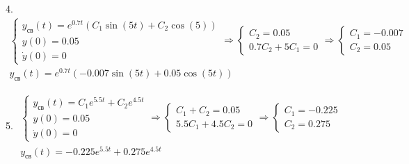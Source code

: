 \vspace{1em}
\begin{par}
\begin{flushleft}
4. $\begin{array}{l}
\left\lbrace \begin{array}{c}
y_{св} (t)=e^{0.7t} (C_1 \sin (5t)+C_2 \cos (5))\\
y(0)=0.05\\
\dot{y} (0)=0
\end{array}\right.\Rightarrow \left\lbrace \begin{array}{c}
C_2 =0.05\\
0.7C_2 +5C_1 =0
\end{array}\right.\Rightarrow \left\lbrace \begin{array}{c}
C_1 =-0.007\\
C_2 =0.05
\end{array}\right.\\
y_{\textrm{св}} (t)=e^{0.7t} (-0.007\sin (5t)+0.05\cos (5t))
\end{array}$
\end{flushleft}
\end{par}


\vspace{1em}
\begin{par}
\begin{flushleft}
5. $\begin{array}{l}
\left\lbrace \begin{array}{c}
y_{св} (t)=C_1 e^{5.5t} +C_2 e^{4.5t} \\
y(0)=0.05\\
\dot{y} (0)=0
\end{array}\right.\Rightarrow \left\lbrace \begin{array}{c}
C_1 +C_2 =0.05\\
5.5C_1 +4.5C_2 =0
\end{array}\right.\Rightarrow \left\lbrace \begin{array}{c}
C_1 =-0.225\\
C_2 =0.275
\end{array}\right.\\
y_{\textrm{св}} (t)=-0.225e^{5.5t} +0.275e^{4.5t} 
\end{array}$
\end{flushleft}
\end{par}


